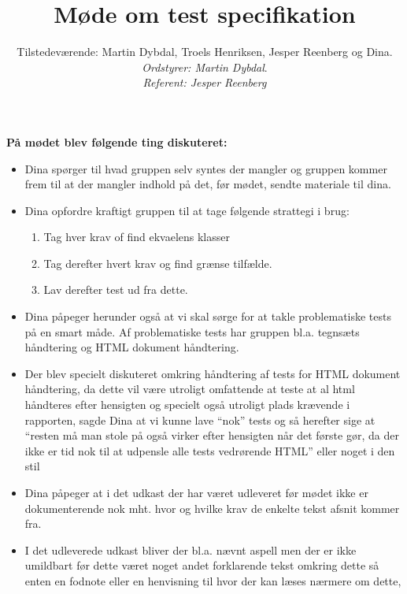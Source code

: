 \documentclass[a4paper,10pt,draft]{article}
\begin{document}
\title{Møde om test specifikation}
\author{Tilstedeværende: Martin Dybdal, Troels Henriksen, Jesper Reenberg og Dina.\\
\textit{Ordstyrer: Martin Dybdal}.\\
\textit{Referent: Jesper Reenberg}}
\maketitle


\textbf{På mødet blev følgende ting diskuteret:}
\\

\begin{itemize}

\item Dina spørger til hvad gruppen selv syntes der mangler og gruppen kommer frem til at der mangler indhold på det, før mødet, sendte materiale til dina.

\item Dina opfordre kraftigt gruppen til at tage følgende strattegi i brug:

\begin{enumerate}
\item Tag hver krav of find ekvaelens klasser
\item Tag derefter hvert krav og find grænse tilfælde.
\item Lav derefter test ud fra dette.
\end{enumerate}

\item Dina påpeger herunder også at vi skal sørge for at takle problematiske tests på en smart måde. Af problematiske tests har gruppen bl.a. tegnsæts håndtering og HTML dokument håndtering.

\item Der blev specielt diskuteret omkring håndtering af tests for HTML dokument håndtering, da dette vil være utroligt omfattende at teste at al html håndteres efter hensigten og specielt også utroligt plads krævende i rapporten, sagde Dina at vi kunne lave ``nok'' tests og så herefter sige at ``resten må man stole på også virker efter hensigten når det første gør, da der ikke er tid nok til at udpensle alle tests vedrørende HTML'' eller noget i den stil

\item Dina påpeger at i det udkast der har været udleveret før mødet ikke er dokumenterende nok mht. hvor og hvilke krav de enkelte tekst afsnit kommer fra.

\item I det udleverede udkast bliver der bl.a. nævnt aspell men der er ikke umildbart før dette været noget andet forklarende tekst omkring dette så enten en fodnote eller en henvisning til hvor der kan læses nærmere om dette,


\end{itemize}
\end{document}
